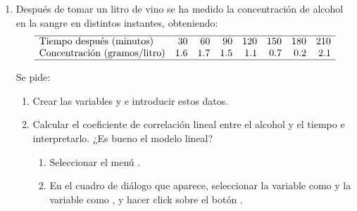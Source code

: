 \begin{enumerate}[leftmargin=*]
\begin{enumerate}
\item Utilizar la recta de regresión para predecir el número de suspensos correspondiente a 3 horas de estudio diarias.
¿Es fiable esta predicción? \begin{indicacion}{
\begin{enumerate}
\item Seleccionar el menú .
\item En el cuadro de diálogo que aparece seleccionar como modelo de regresión la recta calculada en el segundo
apartado, introducir los valores para los que se desea la predicción en el campo  y hacer click
sobre el botón .
\end{enumerate}}
\end{indicacion}

\item Según el modelo lineal, ¿cuántas horas diarias tendrá que estudiar como mínimo un alumno si quiere aprobarlo
todo?
\begin{indicacion}{
Seguir los mismos pasos de los apartados anteriores, pero escogiendo como variable dependiente ,
y como independiente , y haciendo la predicción para 0 suspensos.}
\end{indicacion}
\end{enumerate}


\item Después de tomar un litro de vino se ha medido la concentración de alcohol en la sangre en distintos instantes,
obteniendo:
\[
\begin{array}{lrrrrrrr}
\hline 
\mbox{Tiempo después (minutos)} & 30 & 60 & 90 & 120 & 150 & 180 & 210\\ 
\mbox{Concentración (gramos/litro)} & 1.6 & 1.7 & 1.5 & 1.1 & 0.7 & 0.2 & 2.1\\
\hline
\end{array}
\]

Se pide:
\begin{enumerate}
\item Crear las variables  y  e introducir estos datos.
\item Calcular el coeficiente de correlación lineal entre el alcohol y el tiempo e interpretarlo. ¿Es bueno el modelo
lineal? 
\begin{indicacion}{
\begin{enumerate}
\item Seleccionar el menú .
\item En el cuadro de diálogo que aparece, seleccionar la variable  como 
y la variable  como , y hacer click sobre el botón .
\end{enumerate}}
\end{indicacion}


\end{enumerate}
\end{enumerate}
